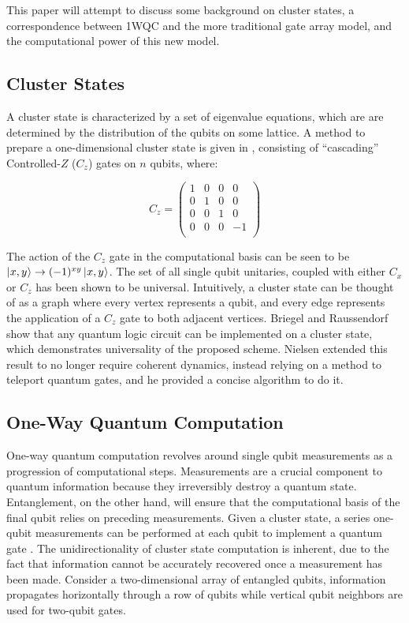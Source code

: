 \documentclass[twocolumn]{IEEEtran11}
\begin{document}
This paper will attempt to discuss some background on cluster states, a correspondence between 1WQC and the more traditional gate array model, and the computational power of this new model.

\subsection{Cluster States}
A cluster state is characterized by a set of eigenvalue equations, which are are determined by the distribution of the qubits on some lattice\cite{briegel2001persistent}. A method to prepare a one-dimensional cluster state is given in \cite{jorrand2005unifying}, consisting of ``cascading'' Controlled-$Z$ ($C_z$) gates on $n$ qubits, where:

\[
C_z = 
\begin{pmatrix}
  1 & 0 & 0 & 0 \\
  0 & 1 & 0 & 0 \\
  0 & 0 & 1 & 0 \\
  0 & 0 & 0 & -1 \\
 \end{pmatrix}
\]

The action of the $C_z$ gate in the computational basis can be seen to be $\left|\mspace{0.5mu} x,y \mspace{0.5mu}\right\rangle \to (-1)^{xy}\left|\mspace{0.5mu} x,y \mspace{0.5mu}\right\rangle$. The set of all single qubit unitaries, coupled with either $C_x$ or $C_z$ has been shown to be universal\cite{brylinski2002universal}. Intuitively, a cluster state can be thought of as a graph where every vertex represents a qubit, and every edge represents the application of a $C_z$ gate to both adjacent vertices. Briegel and Raussendorf show that any quantum logic circuit can be implemented on a cluster state, which demonstrates universality of the proposed scheme\cite{briegel2000measurements}. Nielsen\cite{nielsen108020universal} extended this result to no longer require coherent dynamics, instead relying on a method to teleport quantum gates, and he provided a concise algorithm to do it. 

\subsection{One-Way Quantum Computation}
One-way quantum computation revolves around single qubit measurements as a progression of computational steps. Measurements are a crucial component to quantum information because they irreversibly destroy a quantum state. Entanglement, on the other hand, will ensure that the computational basis of the final qubit relies on preceding measurements. Given a cluster state, a series one-qubit measurements can be performed at each qubit to implement a quantum gate \cite{jorrand2005}.  The unidirectionality of cluster state computation is inherent, due to the fact that information cannot be accurately recovered once a measurement has been made. Consider a two-dimensional array of entangled qubits, information propagates horizontally through a row of qubits while vertical qubit neighbors are used for two-qubit gates. 
\end{document}
